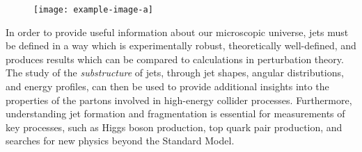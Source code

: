 \begin{figure}[]
    \centering
    \texttt{[image: example-image-a]}
    \caption{
    }
    \label{fig:partonic-cascade}
\end{figure}



In order to provide useful information about our microscopic universe, jets must be defined in a way which is experimentally robust, theoretically well-defined, and produces results which can be compared to calculations in perturbation theory.
%
The study of the \textit{substructure} of jets, through jet shapes, angular distributions, and energy profiles, can then be used to provide additional insights into the properties of the partons involved in high-energy collider processes.
%
Furthermore, understanding jet formation and fragmentation is essential for measurements of key processes, such as Higgs boson production, top quark pair production, and searches for new physics beyond the Standard Model.



%

